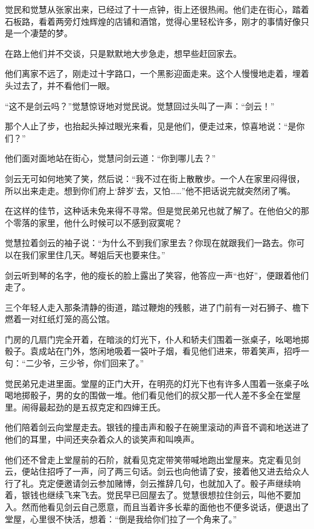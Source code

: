 \par 觉民和觉慧从张家出来，已经过了十一点钟，街上还很热闹。他们走在街心，踏着石板路，看着两旁灯烛辉煌的店铺和酒馆，觉得心里轻松许多，刚才的事情好像只是一个凄楚的梦。
\par 在路上他们并不交谈，只是默默地大步急走，想早些赶回家去。
\par 他们离家不远了，刚走过十字路口，一个黑影迎面走来。这个人慢慢地走着，埋着头过去了，并不看他们一眼。
\par “这不是剑云吗？”觉慧惊讶地对觉民说。觉慧回过头叫了一声：“剑云！”
\par 那个人止了步，也抬起头掉过眼光来看，见是他们，便走过来，惊喜地说：“是你们？”
\par 他们面对面地站在街心，觉慧问剑云道：“你到哪儿去？”
\par 剑云无可如何地笑了笑，然后说：“我不过在街上散散步。一个人在家里闷得很，所以出来走走。想到你们府上‘辞岁’去，又怕……”他不把话说完就突然闭了嘴。
\par 在这样的佳节，这种话未免来得不寻常。但是觉民弟兄也就了解了。在他伯父的那个零落的家里，他什么时候可以不感到寂寞呢？
\par 觉慧拉着剑云的袖子说：“为什么不到我们家里去？你现在就跟我们一路去。你可以在我们家里住几天。琴姐后天也要来住。”
\par 剑云听到琴的名字，他的瘦长的脸上露出了笑容，他答应一声“也好”，便跟着他们走了。
\par 三个年轻人走入那条清静的街道，踏过鞭炮的残骸，进了门前有一对石狮子、檐下燃着一对红纸灯笼的高公馆。
\par 门房的几扇门完全开着，在暗淡的灯光下，仆人和轿夫们围着一张桌子，吆喝地掷骰子。袁成站在门外，悠闲地吸着一袋叶子烟，看见他们进来，带着笑声，招呼一句：“二少爷，三少爷，你们回来了。”
\par 觉民弟兄走进里面。堂屋的正门大开，在明亮的灯光下也有许多人围着一张桌子吆喝地掷骰子，男的女的围做一堆。他们看见他们的叔父那一代人差不多全在堂屋里。闹得最起劲的是五叔克定和四婶王氏。
\par 他们陪着剑云向堂屋走去。银钱的撞击声和骰子在碗里滚动的声音不调和地送进了他们的耳里，中间还夹杂着众人的谈笑声和叫唤声。
\par 他们还不曾走上堂屋前的石阶，就看见克定带笑带喊地跑出堂屋来。克定看见剑云，便站住招呼了一声，问了两三句话。剑云也向他请了安，接着他又进去给众人行了礼。克定便邀请剑云参加赌博，剑云推辞几句，也就加入了。骰子声继续响着，银钱也继续飞来飞去。觉民早已回屋去了。觉慧很想拉住剑云，叫他不要加入。然而他看见剑云自己愿意，而且当着许多长辈的面他也不便多说话，便退出了堂屋，心里很不快活，想着：“倒是我给你们拉了一个角来了。”
